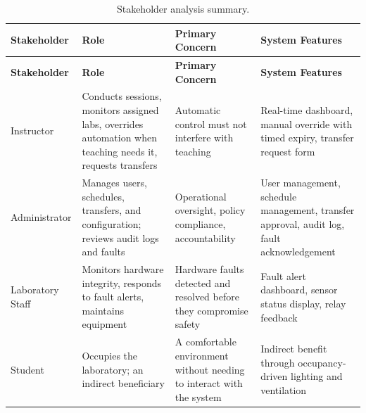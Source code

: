 \begin{longtable}{|L{2.3cm}|L{2.8cm}|L{3.6cm}|L{3.7cm}|}
	\caption{Stakeholder analysis summary.} \label{tab:3-4}                                                                                                                                                                                                                                               \\
	\hline
	\textbf{Stakeholder} & \textbf{Role}                                                                                              & \textbf{Primary Concern}                                              & \textbf{System Features}                                                                  \\
	\hline
	\endfirsthead
	\hline
	\textbf{Stakeholder} & \textbf{Role}                                                                                              & \textbf{Primary Concern}                                              & \textbf{System Features}                                                                  \\
	\hline
	\endhead
	\hline
	\endfoot
	\hline
	\endlastfoot
	Instructor           & Conducts sessions, monitors assigned labs, overrides automation when teaching needs it, requests transfers & Automatic control must not interfere with teaching                    & Real-time dashboard, manual override with timed expiry, transfer request form             \\
	\hline
	Administrator        & Manages users, schedules, transfers, and configuration; reviews audit logs and faults                      & Operational oversight, policy compliance, accountability              & User management, schedule management, transfer approval, audit log, fault acknowledgement \\
	\hline
	Laboratory Staff     & Monitors hardware integrity, responds to fault alerts, maintains equipment                                 & Hardware faults detected and resolved before they compromise safety   & Fault alert dashboard, sensor status display, relay feedback                              \\
	\hline
	Student              & Occupies the laboratory; an indirect beneficiary                                                           & A comfortable environment without needing to interact with the system & Indirect benefit through occupancy-driven lighting and ventilation                        \\

\end{longtable}
